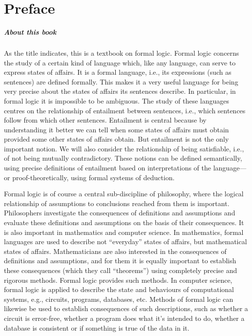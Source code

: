 \chapter{Preface}\label{preface}

\paragraph{About this book}

As the title indicates, this is a textbook on formal logic.  Formal logic concerns the study of a certain kind of language which, like any language, can serve to express states of affairs.  It is a formal language, i.e., its expressions (such as sentences) are defined formally.  This makes it a very useful language for being very precise about the states of affairs its sentences describe. In particular, in formal logic it is impossible to be ambiguous. The study of these languages centres on the relationship of entailment between sentences, i.e., which sentences follow from which other sentences.  Entailment is central because by understanding it better we can tell when some states of affairs must obtain provided some other states of affairs obtain.  But entailment is not the only important notion. We will also consider the relationship of being satisfiable, i.e., of not being mutually contradictory.  These notions can be defined semantically, using precise definitions of entailment based on interpretations of the language---or proof-theoretically, using formal systems of deduction.

Formal logic is of course a central sub-discipline of philosophy, where the logical relationship of assumptions to conclusions reached from them is important.  Philosophers investigate the consequences of definitions and assumptions and evaluate these definitions and assumptions on the basis of their consequences. It is also important in mathematics and computer science. In mathematics, formal languages are used to describe not ``everyday'' states of affairs, but mathematical states of affairs. Mathematicians are also interested in the consequences of definitions and assumptions, and for them it is equally important to establish these consequences (which they call ``theorems'') using completely precise and rigorous methods. Formal logic provides such methods.  In computer science, formal logic is applied to describe the state and behaviours of computational systems, e.g., circuits, programs, databases, etc.  Methods of formal logic can likewise be used to establish consequences of such descriptions, such as whether a circuit is error-free, whether a program does what it's intended to do, whether a database is consistent or if something is true of the data in it.

